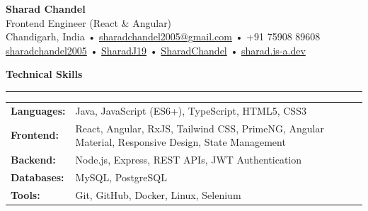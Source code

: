\documentclass[10pt, letterpaper]{article}
\newcommand{\resumesection}[1]{
    \vspace{6pt}
    {\large \textbf{\textcolor{accent}{#1}}}
    \vspace{1pt}\hrule
    \vspace{4pt}
}
\begin{document}
\begin{center}
    {\Huge \textbf{Sharad Chandel}} \\[2pt]
    {\large Frontend Engineer (React \& Angular)} \\[4pt]
     Chandigarh, India •
     \href{mailto:sharadchandel2005@gmail.com}{sharadchandel2005@gmail.com} •
     +91 75908 89608 \\
     \href{https://linkedin.com/in/sharadchandel2005}{sharadchandel2005} •
     \href{https://github.com/SharadJ19}{SharadJ19} •
     \href{https://leetcode.com/u/SharadChandel/}{SharadChandel} •
     \href{http://sharad.is-a.dev/}{sharad.is-a.dev}
\end{center}

\resumesection{Technical Skills}
\begin{tabularx}{\textwidth}{@{}l X@{}}
\textbf{Languages:} & Java, JavaScript (ES6+), TypeScript, HTML5, CSS3 \\
\textbf{Frontend:} & React, Angular, RxJS, Tailwind CSS, PrimeNG, Angular Material, Responsive Design, State Management \\
\textbf{Backend:} & Node.js, Express, REST APIs, JWT Authentication \\
\textbf{Databases:} & MySQL, PostgreSQL \\
\textbf{Tools:} & Git, GitHub, Docker, Linux, Selenium \\
\end{tabularx}
\end{document}
